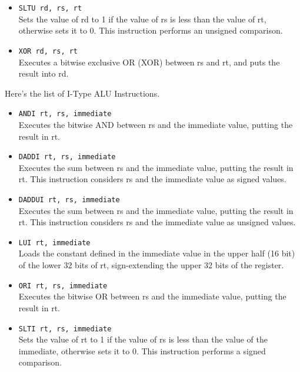 \documentclass[12pt]{report}
\begin{document}
\begin{itemize}
	\item \texttt{SLTU rd, rs, rt}\\
	Sets the value of rd to 1 if the value of rs is less than the value of rt,
	otherwise sets it to 0. This instruction performs an unsigned comparison.

	\item \texttt{XOR rd, rs, rt}\\
	Executes a bitwise exclusive OR (XOR) between rs and rt, and puts the result into rd.
\end{itemize}

Here's the list of I-Type ALU Instructions.

\begin{itemize}
	\item \texttt{ANDI rt, rs, immediate}\\
	Executes the bitwise AND between rs and the immediate value, putting the
	result in rt.

	\item \texttt{DADDI rt, rs, immediate}\\
	Executes the sum between rs and the immediate value, putting the result in
	rt. This instruction considers rs and the immediate value as signed
	values.

	\item \texttt{DADDUI rt, rs, immediate}\\
	Executes the sum between rs and the immediate value, putting the result in
	rt. This instruction considers rs and the immediate value as unsigned
	values.

	\item \texttt{LUI rt, immediate}\\
	Loads the constant defined in the immediate value in the upper half (16 bit) of the
	lower 32 bits of rt, sign-extending the upper 32 bits of the register.

	\item \texttt{ORI rt, rs, immediate}\\
	Executes the bitwise OR between rs and the immediate value, putting the
	result in rt.

	\item \texttt{SLTI rt, rs, immediate}\\
	Sets the value of rt to 1 if the value of rs is less than the value of the
	immediate, otherwise sets it to 0. This instruction performs a signed comparison.


\end{itemize}
\end{document}
